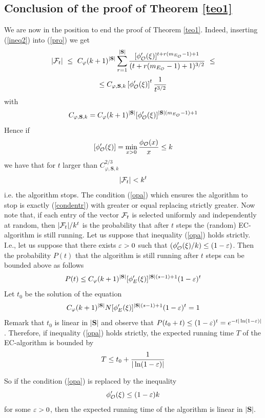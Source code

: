 \documentclass[11pt]{article}
\let\\=\noindent
\def\ee{\end{equation}}
\def\be{\begin{equation}}
\begin{document}
\subsection{Conclusion of the proof of Theorem \ref{teo1}}\label{conclu}
We are now in the position to end the proof of Theorem \ref{teo1}. Indeed,
inserting (\ref{ineq2}) into
(\ref{pro}) we get
$$
|{\cal F} _t|~\le ~  C_{\varphi} (k+1)^{|\mathbf{S}|} \sum_{r=1}^{|\mathbf{S}|}
 {[\phi'_{{\mathcal O}}(\xi)]^{t+r(m_{E_{{\mathcal O}}}-1)+1}\over ({t+r(m_{E_{{\mathcal O}}}-1)+1})^{3/2}}~\le
$$
$$
\le  C_{\varphi,\mathbf{S}, k} \left[\phi_{{\mathcal O}}'(\xi)\right]^{t}
{1\over {t}^{3/2}}
$$
with
$$
C_{\varphi,\mathbf{S}, k}= C_{\varphi} (k+1)^{|\mathbf{S}|} [\phi_{{\mathcal O}}'(\xi)]^{{|\mathbf{S}|}(m_{E_{{\mathcal O}}}-1)+1}
$$
Hence
if
\be\label{opa}
\left[ \phi_\A'(\x)\right]=\min_{x>0}{\phi_\A(x)\over x}\le k
\ee
we have that for $t$  larger than $C_{\varphi,\mathbf{S}, k}^{2/3}$
$$
|{\cal F} _t|< k^t
$$
i.e. the algorithm stops. The condition (\ref{opa}) which ensures
the algorithm to stop is exactly (\ref{condentr}) with greater or equal replacing strictly greater.
Now note that, if each entry of the vector ${\cal F} _t$ is selected uniformly and independently at random, then  $|{\cal F} _t|/k^t$ is the probability that after $t$ steps the (random) EC-algorithm is still running.
Let
us  suppose that inequality (\ref{opa}) holds strictly. I.e., let us suppose that there exists $\varepsilon>0$ such
that $({ \phi_{{\mathcal O}}'(\xi)/k})\le (1-\varepsilon)$.
Then
the probability $P(t)$
that the algorithm is still running  after $t$ steps can be bounded above as follows
$$
P(t)\le C_{\varphi} (k+1)^{|\mathbf{S}|} [\phi_E'(\xi)]^{|\mathbf{S}|(s-1)+1}{(1-\varepsilon)^t}
$$
Let $t_0$ be the solution of the equation
$$
C_{\varphi} (k+1)^{|\mathbf{S}|}N [\phi_E'(\xi)]^{|\mathbf{S}|(s-1)+1}{(1-\varepsilon)^t}=1
$$
Remark that $t_0$ is linear in $|\mathbf{S}|$ and observe that
$P(t_0+t)\le (1-\varepsilon)^t=e^{-t|\ln(1-\varepsilon)|}$.
Therefore, if  inequality (\ref{opa}) holds strictly, the expected running  time $T$ of the EC-algorithm is bounded by
$$
T\le t_0+{1\over |\ln(1-\varepsilon)|}
$$


\\So if the condition  (\ref{opa}) is replaced by the  inequality
\be\label{opa2}
 \phi_\A'(\x)\le (1-\e)k
\ee
for some $\varepsilon>0$,
then the expected running time of the algorithm is linear in $|\mathbf{S}|$.
\end{document}
